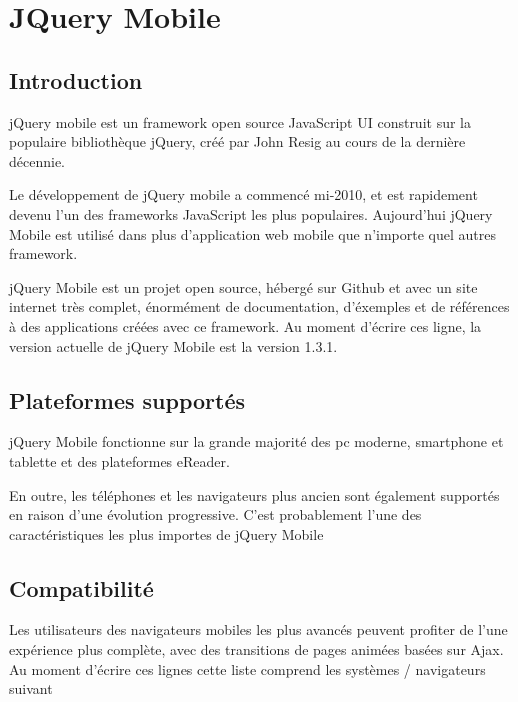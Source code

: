 \section{JQuery Mobile}
\label{ch:jquery mobile}

\subsection{Introduction}

jQuery mobile est un framework open source JavaScript UI construit sur la populaire bibliothèque jQuery, créé par John Resig au cours de la dernière décennie.

Le développement de jQuery mobile a commencé mi-2010, et est rapidement devenu l’un des frameworks JavaScript les plus populaires. Aujourd’hui jQuery Mobile est utilisé dans plus d’application web mobile que n'importe quel autres framework.

jQuery Mobile est un projet open source, hébergé sur Github et avec un site internet très complet, énormément de documentation, d’éxemples et de références à des applications créées avec ce framework.
Au moment d’écrire ces ligne, la version actuelle de jQuery Mobile est la version  1.3.1.

\subsection{Plateformes supportés}

jQuery Mobile fonctionne sur la grande majorité des pc moderne, smartphone et tablette et des plateformes eReader.

En outre, les téléphones et les navigateurs plus ancien sont également supportés en raison d’une évolution progressive. C’est probablement l’une des caractéristiques les plus importes de jQuery Mobile

\subsection{Compatibilité}

Les utilisateurs des navigateurs mobiles les plus avancés peuvent profiter de l’une expérience plus complète, avec des transitions de pages animées basées sur Ajax. Au moment d’écrire ces lignes cette liste comprend les systèmes / navigateurs suivant

